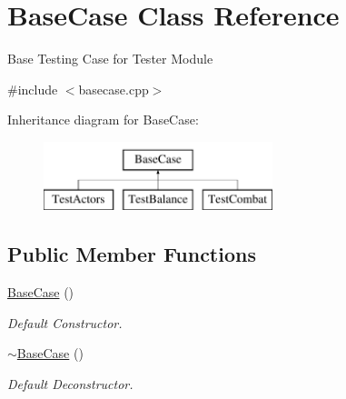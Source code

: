 \hypertarget{classBaseCase}{}\section{Base\+Case Class Reference}
\label{classBaseCase}


Base Testing Case for Tester Module ~\newline
  




{\ttfamily \#include $<$basecase.\+cpp$>$}

Inheritance diagram for Base\+Case\+:\begin{figure}[H]
\begin{center}
\leavevmode
\includegraphics[height=2.000000cm]{classBaseCase}
\end{center}
\end{figure}
\subsection*{Public Member Functions}
\begin{DoxyCompactItemize}
\item 
\mbox{\label{classBaseCase_a3a66491e633d93e6fbdca84f9189fb8d}} 
\mbox{\hyperlink{classBaseCase_a3a66491e633d93e6fbdca84f9189fb8d}{Base\+Case}} ()
\begin{DoxyCompactList}\small\item\em Default Constructor. \end{DoxyCompactList}\item 
\mbox{\label{classBaseCase_acb6a604a3bfe207cc03b3ccb6a550af2}} 
\mbox{\hyperlink{classBaseCase_acb6a604a3bfe207cc03b3ccb6a550af2}{$\sim$\+Base\+Case}} ()
\begin{DoxyCompactList}\small\item\em Default Deconstructor. \end{DoxyCompactList}\end{DoxyCompactItemize}
